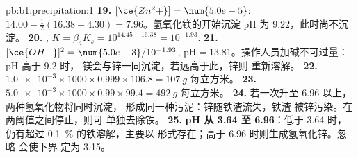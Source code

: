 \begin{solution}{pb:b1:precipitation:1}
\textbf{19.} $[\ce{Zn^2+}] = \num{5.0e-5}$: $14.00 - \frac12(16.38 - 4.30) =
7.96$。氢氧化镁的开始沉淀 pH 为 9.22，此时尚不沉淀。
\textbf{20.} , $K = \beta_4 K_s =
10^{14.45 - 16.38} = 10^{-1.93}$.
\textbf{21.} $[\ce{OH-}]^2 = \num{5.0e-3}/10^{-1.93}$, $\mathrm{pH} =
13.81$。操作人员加碱不可过量：pH 高于 9.2 时，
镁会与锌一同沉淀，若远高于此，锌则
重新溶解。
\textbf{22.} $\num{1.0e-3} \times 1000 \times 0.999 \times 106.8 =
\qty{107}{g}$ 每立方米。
\textbf{23.} $\num{5.0e-3} \times 1000 \times 0.99 \times 99.4 =
\qty{492}{g}$ 每立方米。
\textbf{24.} 若一次升至 6.96 以上，两种氢氧化物将同时沉淀，
形成同一种污泥：锌随铁渣流失，铁渣
被锌污染。在两阈值之间停止，则可
单独去除铁。
\textbf{25.} \textbf{pH 从 3.64 至 6.96}：低于 3.64 时，仍有超过
\qty{0.1}{\percent} 的铁溶解，主要以  形式存在；高于
6.96 时则生成氢氧化锌。忽略  会使下界
定为 3.15。
\end{solution}
